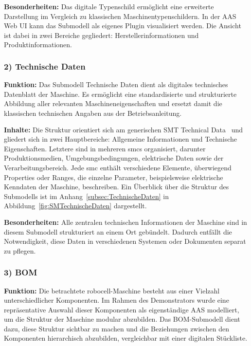 \textbf{Besonderheiten:}  
Das digitale Typenschild ermöglicht eine erweiterte Darstellung im Vergleich zu klassischen Maschinentypenschildern. In der AAS Web UI kann das Submodell als eigenes Plugin visualisiert werden. 
Die Ansicht ist dabei in zwei Bereiche gegliedert: Herstellerinformationen und Produktinformationen.

\subsubsection*{2) Technische Daten}
\vspace{-0.5em}
\textbf{Funktion:}  
Das Submodell Technische Daten dient als digitales technisches Datenblatt der Maschine.
Es ermöglicht eine standardisierte und strukturierte Abbildung aller relevanten Maschineneigenschaften und ersetzt damit die klassischen technischen Angaben aus der Betriebsanleitung.

\textbf{Inhalte:} 
Die Struktur orientiert sich am generischen SMT Technical Data~\cite{SpezifikaitonTechnischeDaten} und gliedert sich in zwei Hauptbereiche: Allgemeine Informationen und Technische Eigenschaften.
Letztere sind in mehreren \acsp{smc} organisiert, darunter Produktionsmedien, Umgebungsbedingungen, elektrische Daten sowie der Verarbeitungsbereich.
Jede \acs{smc} enthält verschiedene Elemente, überwiegend Properties oder Ranges, die einzelne Parameter, beispielsweise elektrische Kenndaten der Maschine, beschreiben.
Ein Überblick über die Struktur des Submodells ist im Anhang~\ref{subsec:TechnischeDaten} in Abbildung~\ref{fig:SMTechnischeDaten} dargestellt.

\textbf{Besonderheiten:}  
Alle zentralen technischen Informationen der Maschine sind in diesem Submodell strukturiert an einem Ort gebündelt.
Dadurch entfällt die Notwendigkeit, diese Daten in verschiedenen Systemen oder Dokumenten separat zu pflegen.

\subsubsection*{3) BOM}
\vspace{-0.5em}
\textbf{Funktion:}  
Die betrachtete robocell-Maschine besteht aus einer Vielzahl unterschiedlicher Komponenten.
Im Rahmen des Demonstrators wurde eine repräsentative Auswahl dieser Komponenten als eigenständige AAS modelliert, um die Struktur der Maschine modular abzubilden.
Das BOM-Submodell dient dazu, diese Struktur sichtbar zu machen und die Beziehungen zwischen den Komponenten hierarchisch abzubilden, vergleichbar mit einer digitalen Stückliste.

